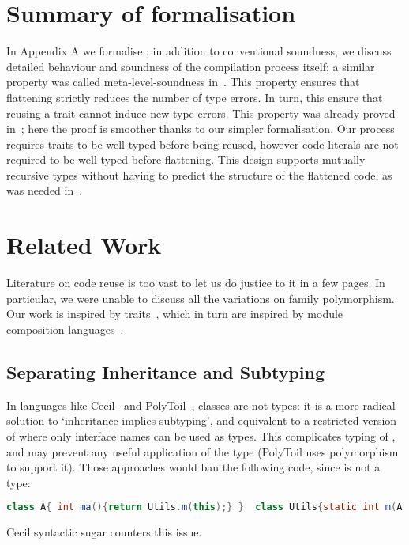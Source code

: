 \saveSpace
\section{Summary of formalisation}
\saveSpace
In Appendix A we formalise \name; in addition to conventional soundness, we 
discuss detailed behaviour and soundness
of the compilation process itself;
a similar property was called meta-level-soundness in~\cite{servetto2014meta}.
This property ensures that flattening strictly reduces the number of type errors.
In turn, this
ensure that reusing a trait cannot induce new type errors.
This property was already proved in~\cite{servetto2014meta}; here
the proof is smoother thanks to our simpler formalisation.
Our process requires traits to be well-typed before being reused,
however code literals are not required to be well typed before flattening.
This design supports mutually recursive types without having to
predict the structure of the flattened code, as was
needed in~\cite{deep}.

\saveSpace
\section{Related Work}
\saveSpace
Literature on code reuse is too vast to let us do justice to it in a few pages.
In particular, we were unable to discuss all the variations on family polymorphism.
Our work is inspired by traits~\cite{ducasse2006traits}, which in turn
are inspired by module composition languages~\cite{ancona2002calculus}.

\subsection{Separating Inheritance and Subtyping}
In languages like Cecil~\cite{chambers1995typechecking} and PolyToil~\cite{bruce1995polytoil},
classes are not types: it is a more radical solution to `inheritance implies subtyping', and equivalent to a restricted version of \name where only interface names can be used as types.
This complicates typing of \Q@this@,
and may prevent any useful application of the \Q@This@ type (PolyToil uses polymorphism to support it).
Those approaches would ban the following code,
since \Q@A@ is not a type:
\saveSpace\saveSpace\begin{lstlisting}[language=Java]
class A{ int ma(){return Utils.m(this);} }  class Utils{static int m(A a){..}}
\end{lstlisting}\saveSpace\saveSpace
Cecil syntactic sugar counters this issue. 

